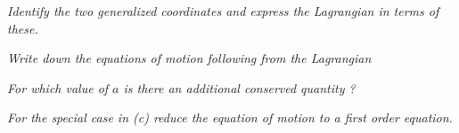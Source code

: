 \documentclass[12pt]{article} %
\begin{document}
\begin{enumproblem}

\item \textit{
Identify the two generalized coordinates and express the Lagrangian in terms of these. 
}


\item \textit{
Write down the equations of motion following from the Lagrangian
}


\item \textit{
For which value of $a$ is there an additional conserved quantity ?
}


\item \textit{
For the special case in (c) reduce the equation of motion to a first order equation.
}


\end{enumproblem}
\end{document}
